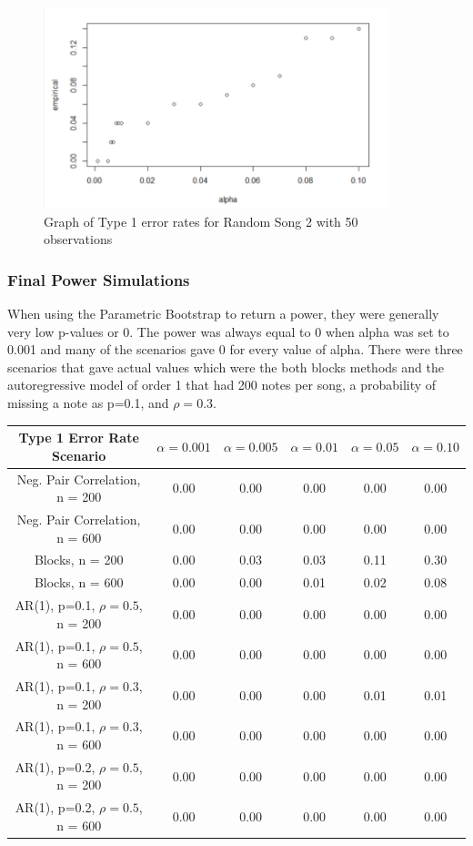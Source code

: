 \documentclass[12pt, letterpaper]{article}
\begin{document}
\begin{figure}[!hb]
\centering
\includegraphics[width=10cm]{Type1_Song2.png}
\caption{Graph of Type 1 error rates for Random Song 2 with 50 observations}
\label{fig: Type 1 Error, Song 2, n=50}
\end{figure}


\subsubsection{Final Power Simulations}
When using the Parametric Bootstrap to return a power, they were generally very low p-values or 0.  The power was always equal to 0 when alpha was set to 0.001 and many of the scenarios gave 0 for every value of alpha.  There were three scenarios that gave actual values which were the both blocks methods and the autoregressive model of order 1 that had 200 notes per song, a probability of missing a note as p=0.1, and $\rho = 0.3$. \\

\begin{tabular}{|c|c|c|c|c|c|}
\hline
\textbf{Type 1 Error Rate Scenario} & $\alpha = 0.001$ &  $\alpha = 0.005$ &  $\alpha = 0.01$ &  $\alpha = 0.05$ &  $\alpha = 0.10$ \\
\hline
Neg. Pair Correlation, n = 200 & 0.00 & 0.00 & 0.00 & 0.00 & 0.00 \\
\hline
Neg. Pair Correlation, n = 600 & 0.00 & 0.00 & 0.00 & 0.00 & 0.00 \\
\hline
Blocks, n = 200 & 0.00 & 0.03 & 0.03 & 0.11 & 0.30 \\
\hline
Blocks, n = 600 & 0.00 & 0.00 & 0.01 & 0.02 & 0.08 \\
\hline
AR(1), p=0.1, $\rho = 0.5$, n = 200 & 0.00 & 0.00 & 0.00 & 0.00 & 0.00 \\
\hline
AR(1), p=0.1, $\rho = 0.5$, n = 600 & 0.00 & 0.00 & 0.00 & 0.00 & 0.00 \\
\hline
AR(1), p=0.1, $\rho = 0.3$, n = 200 & 0.00 & 0.00 & 0.00 & 0.01 & 0.01 \\
\hline
AR(1), p=0.1, $\rho = 0.3$, n = 600 & 0.00 & 0.00 & 0.00 & 0.00 & 0.00 \\
\hline
AR(1), p=0.2, $\rho = 0.5$, n = 200 & 0.00 & 0.00 & 0.00 & 0.00 & 0.00 \\
\hline
AR(1), p=0.2, $\rho = 0.5$, n = 600 & 0.00 & 0.00 & 0.00 & 0.00 & 0.00 \\
\hline
\end{tabular} \\
\end{document}
